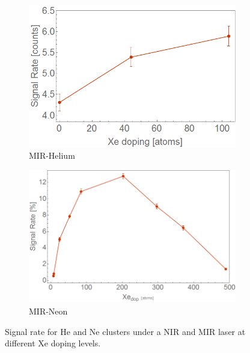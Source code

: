 \begin{figure}[h!]
\begin{subfigure}[l]{0.48\textwidth} \caption{MIR-Helium}
\includegraphics[width=1\textwidth]{../Images/results/MIR_He_XeCaDop/Xe_SignalRate.png}  \end{subfigure}
\begin{subfigure}[l]{0.48\textwidth} \caption{MIR-Neon } 
\includegraphics[width=1\textwidth]{../Images/results/MIR_Ne_XeDop_39K/SigRate.png} \end{subfigure}
\caption[Xe doping scan-signal rate]{  Signal rate for He and Ne clusters under a NIR and MIR laser at different Xe doping levels.}
\label{fig:IntensitySigRate}
\end{figure}

